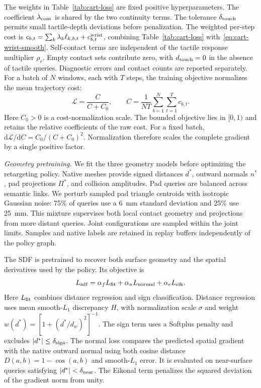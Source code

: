The weights in Table~\ref{tab:cart-loss} are fixed positive hyperparameters. The coefficient $\lambda_{\rm cont}$ is shared by the two continuity terms. The tolerance $\delta_{\rm touch}$ permits small tactile-depth deviations before penalization. The weighted per-step cost is $c_{b,t}=\sum_k\lambda_k\ell_{k,b,t}+c_{b,t}^{\rm wrist}$, combining Table~\ref{tab:cart-loss} with~\eqref{eq:cart-wrist-smooth}. Self-contact terms are independent of the tactile response multiplier $\rho_r$. Empty contact sets contribute zero, with $d_{\rm touch}=0$ in the absence of tactile queries. Diagnostic errors and contact counts are reported separately. For a batch of $N$ windows, each with $T$ steps, the training objective normalizes the mean trajectory cost:
\begin{equation}
    \mathcal L=\frac{C}{C+C_0},\qquad
    C=\frac{1}{NT}\sum_{b=1}^{N}\sum_{t=1}^{T}c_{b,t}.
    \label{eq:cart-training-loss}
\end{equation}
Here $C_0>0$ is a cost-normalization scale. The bounded objective lies in $[0,1)$ and retains the relative coefficients of the raw cost. For a fixed batch, $\mathrm d\mathcal L/\mathrm dC=C_0/(C+C_0)^2$. Normalization therefore scales the complete gradient by a single positive factor.

\textit{Geometry pretraining.} We fit the three geometry models before optimizing the retargeting policy. Native meshes provide signed distances $d^*$, outward normals $n^*$, pad projections $\Pi^*$, and collision amplitudes. Pad queries are balanced across semantic links. We perturb sampled pad triangle centroids with isotropic Gaussian noise: 75\% of queries use a 6~mm standard deviation and 25\% use 25~mm. This mixture supervises both local contact geometry and projections from more distant queries. Joint configurations are sampled within the joint limits. Samples and native labels are retained in replay buffers independently of the policy graph.

The SDF is pretrained to recover both surface geometry and the spatial derivatives used by the policy. Its objective is
\begin{equation}
    L_{\rm sdf}=\alpha_f L_{\rm fit}
                +\alpha_n L_{\rm normal}
                +\alpha_e L_{\rm eik}.
    \label{eq:cart-distance-supervision}
\end{equation}
Here $L_{\rm fit}$ combines distance regression and sign classification. Distance regression uses mean smooth-$L_1$ discrepancy $H$, with normalization scale $\sigma$ and weight $w(d^*)=[1+(d^*/d_w)^2]^{-1}$. The sign term uses a Softplus penalty and excludes $|d^*|\leq\delta_{\rm sign}$. The normal loss compares the predicted spatial gradient with the native outward normal using both cosine distance $D(a,b)=1-\cos(a,b)$ and smooth-$L_1$ error. It is evaluated on near-surface queries satisfying $|d^*|<\delta_{\rm near}$. The Eikonal term penalizes the squared deviation of the gradient norm from unity.

